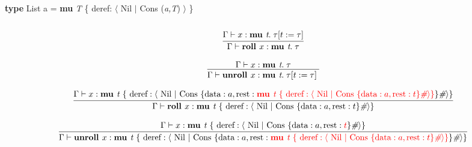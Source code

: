\documentclass{article}
\begin{document}
\lstset{language=Pascal}          %



\textbf{type} List a = \textbf{mu} \textit{T} \{ deref: $\langle$ Nil $\vert$ Cons (\textit{a,T}) $\rangle$ \} \\ \\

\[
    \infer{
        \Gamma \vdash \textbf{roll } x : \textbf{mu } \textit{t}.\; \tau
    }{
        \Gamma \vdash x : \textbf{mu } \textit{t}.\; \tau[ t := \tau]
    }
\]

\[
    \infer{
        \Gamma \vdash \textbf{unroll } x : \textbf{mu } \textit{t}.\; \tau[ t := \tau]\; 
    }{
        \Gamma \vdash x : \textbf{mu } \textit{t}.\; \tau
    }
\]

\[
    \infer{
        \Gamma \vdash \textbf{roll } x : \textbf{mu } \textit{t } \{ \text{ deref}: \langle \text{ Nil } \vert \text{ Cons } \{ \text{data}: a, \text{rest}: t \}\textit{\#} \rangle \} 
    }{
        \Gamma \vdash x : \textbf{mu } \textit{t } \{ \text{ deref}: \langle \text{ Nil } \vert \text{ Cons } \{ \text{data}: a, \text{rest}: {\color{red} \textbf{mu } \textit{t } \{ \text{ deref}: \langle \text{ Nil } \vert \text{ Cons } \{ \text{data}: a, \text{rest}: t \}\textit{\#} \rangle \} } \}\textit{\#} \rangle \} 
    }
\]

\[
    \infer{
        \Gamma \vdash \textbf{unroll } x : \textbf{mu } \textit{t } \{ \text{ deref}: \langle \text{ Nil } \vert \text{ Cons } \{ \text{data}: a, \text{rest}: {\color{red} \textbf{mu } \textit{t } \{ \text{ deref}: \langle \text{ Nil } \vert \text{ Cons } \{ \text{data}: a, \text{rest}: t \}\textit{\#} \rangle \} } \}\textit{\#} \rangle \} 
    }{
        \Gamma \vdash x : \textbf{mu } \textit{t } \{ \text{ deref}: \langle \text{ Nil } \vert \text{ Cons } \{ \text{data}: a, \text{rest}: {\color{red} t} \}\textit{\#} \rangle \} 
    }
\]
\end{document}
